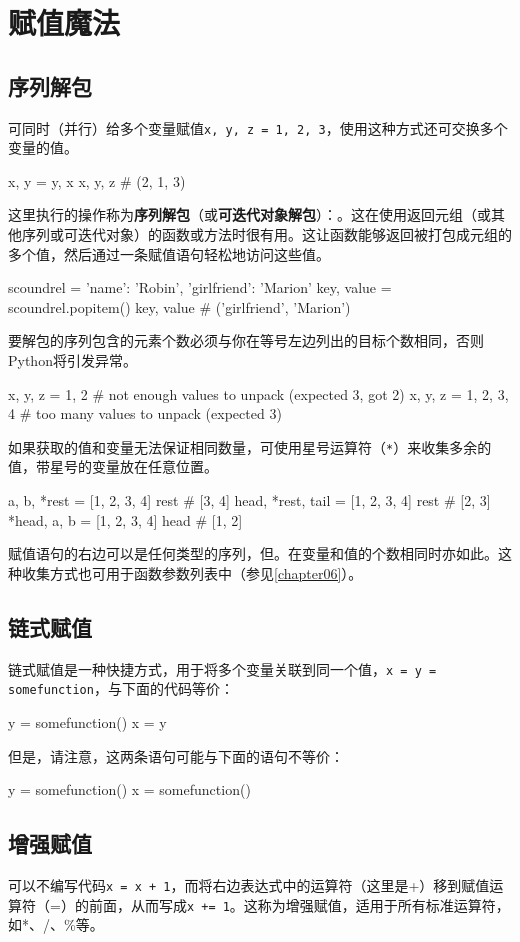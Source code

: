 \section{赋值魔法}
\subsection{序列解包}
可同时（并行）给多个变量赋值\verb|x, y, z = 1, 2, 3|，使用这种方式还可交换多个变量的值。
\begin{pyc}
x, y = y, x
x, y, z  # (2, 1, 3)
\end{pyc}
这里执行的操作称为\textbf{序列解包}（或\textbf{可迭代对象解包}）：。这在使用返回元组（或其他序列或可迭代对象）的函数或方法时很有用。这让函数能够返回被打包成元组的多个值，然后通过一条赋值语句轻松地访问这些值。
\begin{pyc}
scoundrel = {'name': 'Robin', 'girlfriend': 'Marion'}
key, value = scoundrel.popitem()
key, value  # ('girlfriend', 'Marion')
\end{pyc}

要解包的序列包含的元素个数必须与你在等号左边列出的目标个数相同，否则Python将引发异常。
\begin{pyc}
x, y, z = 1, 2
# not enough values to unpack (expected 3, got 2)
x, y, z = 1, 2, 3, 4  # too many values to unpack (expected 3)
\end{pyc}
如果获取的值和变量无法保证相同数量，可使用星号运算符（\verb|*|）来收集多余的值，带星号的变量放在任意位置。
\begin{pyc}
a, b, *rest = [1, 2, 3, 4]
rest  # [3, 4]
head, *rest, tail = [1, 2, 3, 4]
rest  # [2, 3]
*head, a, b = [1, 2, 3, 4]
head  # [1, 2]
\end{pyc}
赋值语句的右边可以是任何类型的序列，但。在变量和值的个数相同时亦如此。这种收集方式也可用于函数参数列表中（参见\autoref{chapter06}）。
\subsection{链式赋值}
链式赋值是一种快捷方式，用于将多个变量关联到同一个值，\verb|x = y = somefunction|，与下面的代码等价：
\begin{pyc}
y = somefunction()
x = y
\end{pyc}
但是，请注意，这两条语句可能与下面的语句不等价：
\begin{pyc}
y = somefunction()
x = somefunction()
\end{pyc}
\subsection{增强赋值}
可以不编写代码\verb|x = x + 1|，而将右边表达式中的运算符（这里是+）移到赋值运算符（=）的前面，从而写成\verb|x += 1|。这称为增强赋值，适用于所有标准运算符，如*、/、\%等。

